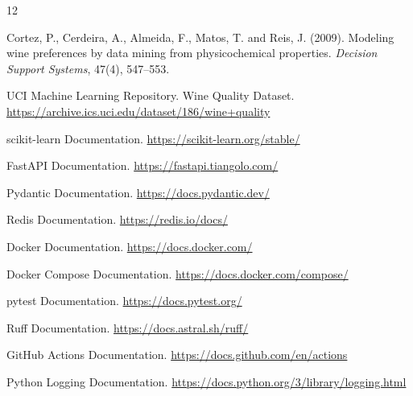 \documentclass[11pt,a4paper]{article}
\begin{document}
\begin{thebibliography}{12}

Cortez, P., Cerdeira, A., Almeida, F.,
Matos, T. and Reis, J. (2009).
Modeling wine preferences by data mining
from physicochemical properties.
\emph{Decision Support Systems},
47(4), 547--553.

UCI Machine Learning Repository.
Wine Quality Dataset.
\url{https://archive.ics.uci.edu/dataset/186/wine+quality}

scikit-learn Documentation.
\url{https://scikit-learn.org/stable/}

FastAPI Documentation.
\url{https://fastapi.tiangolo.com/}

Pydantic Documentation.
\url{https://docs.pydantic.dev/}

Redis Documentation.
\url{https://redis.io/docs/}

Docker Documentation.
\url{https://docs.docker.com/}

Docker Compose Documentation.
\url{https://docs.docker.com/compose/}

pytest Documentation.
\url{https://docs.pytest.org/}

Ruff Documentation.
\url{https://docs.astral.sh/ruff/}

GitHub Actions Documentation.
\url{https://docs.github.com/en/actions}

Python Logging Documentation.
\url{https://docs.python.org/3/library/logging.html}

\end{thebibliography}
\end{document}
